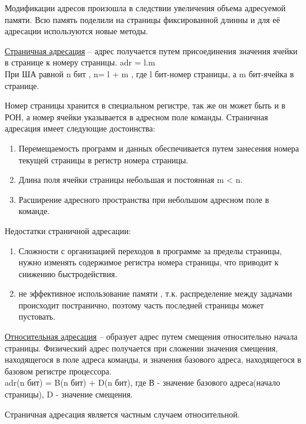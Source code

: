 \documentclass[unicode, 12pt, a4paper, oneside]{article}
\begin{document}
Модификации адресов произошла в следствии увеличения объема адресуемой памяти. Всю память поделили на страницы фиксированной длинны и для её адресации используются новые методы.

\underline{Страничная адресация} -- адрес получается путем присоединения значения ячейки в странице к номеру страницы. adr = l.m\\
При ША равной n бит , n= l + m , где l бит-номер страницы, а m бит-ячейка в странице.

Номер страницы хранится в специальном регистре, так же он может быть и в РОН, а номер ячейки указывается в адресном поле команды.
Страничная адресация имеет следующие достоинства:
\begin{enumerate}
\item Перемещаемость программ и данных обеспечивается путем занесения номера текущей страницы в регистр номера страницы.
\item Длина поля ячейки страницы небольшая и постоянная m < n.
\item Расширение адресного пространства при небольшом адресном поле в команде.
\end{enumerate}
Недостатки страничной адресации:
\begin{enumerate}
\item Сложности с организацией переходов в программе за пределы страницы, нужно изменять содержимое регистра номера страницы, что приводит к снижению быстродействия.
\item не эффективное использование памяти , т.к. распределение между задачами происходит постранично, поэтому часть последней страницы может пустовать. 
\end{enumerate}

\underline{Относительная адресация} -- образует адрес путем смещения относительно начала страницы. Физический адрес получается при сложении значения  смещения, находящегося в поле адреса команды, и значения базового  адреса, находящегося в базовом регистре процессора.\\
adr(n бит) = B(n бит) + D(n бит), где В - значение базового адреса(начало страницы), D - значение смещения.

Страничная адресация является частным случаем относительной. 
\end{document}
